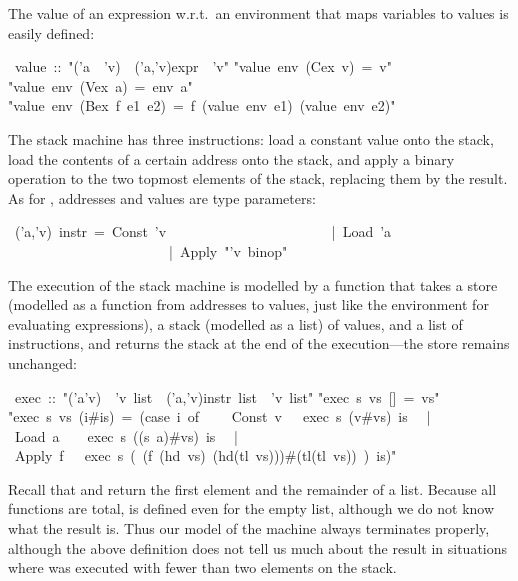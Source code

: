 \begin{isabelle}
\begin{isamarkuptext}
The value of an expression w.r.t.\ an environment that maps variables to
values is easily defined:%
\end{isamarkuptext}%
~value~::~{"}('a~{\isasymRightarrow}~'v)~{\isasymRightarrow}~('a,'v)expr~{\isasymRightarrow}~'v{"}\isanewline
{}\isanewline
{"}value~env~(Cex~v)~=~v{"}\isanewline
{"}value~env~(Vex~a)~=~env~a{"}\isanewline
{"}value~env~(Bex~f~e1~e2)~=~f~(value~env~e1)~(value~env~e2){"}%
\begin{isamarkuptext}%
The stack machine has three instructions: load a constant value onto the
stack, load the contents of a certain address onto the stack, and apply a
binary operation to the two topmost elements of the stack, replacing them by
the result. As for , addresses and values are type parameters:%
\end{isamarkuptext}%
~('a,'v)~instr~=~Const~'v\isanewline
~~~~~~~~~~~~~~~~~~~~~~~|~Load~'a\isanewline
~~~~~~~~~~~~~~~~~~~~~~~|~Apply~{"}'v~binop{"}%
\begin{isamarkuptext}%
The execution of the stack machine is modelled by a function 
that takes a store (modelled as a function from addresses to values, just
like the environment for evaluating expressions), a stack (modelled as a
list) of values, and a list of instructions, and returns the stack at the end
of the execution---the store remains unchanged:%
\end{isamarkuptext}%
~exec~::~{"}('a{\isasymRightarrow}'v)~{\isasymRightarrow}~'v~list~{\isasymRightarrow}~('a,'v)instr~list~{\isasymRightarrow}~'v~list{"}\isanewline
{}\isanewline
{"}exec~s~vs~[]~=~vs{"}\isanewline
{"}exec~s~vs~(i\#is)~=~(case~i~of\isanewline
~~~~Const~v~~{\isasymRightarrow}~exec~s~(v\#vs)~is\isanewline
~~|~Load~a~~~{\isasymRightarrow}~exec~s~((s~a)\#vs)~is\isanewline
~~|~Apply~f~~{\isasymRightarrow}~exec~s~(~(f~(hd~vs)~(hd(tl~vs)))\#(tl(tl~vs))~)~is){"}%
\begin{isamarkuptext}%
\noindent
Recall that  and 
return the first element and the remainder of a list.
Because all functions are total,  is defined even for the empty
list, although we do not know what the result is. Thus our model of the
machine always terminates properly, although the above definition does not
tell us much about the result in situations where  was executed
with fewer than two elements on the stack.


\end{isamarkuptext}
\end{isabelle}
